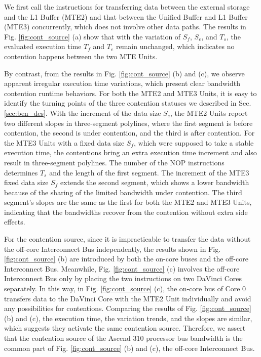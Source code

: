 \documentclass[12pt]{extbook}
\begin{document}
We first call the instructions for transferring data between the external storage and the L1 Buffer (MTE2) and that between the Unified Buffer and L1 Buffer (MTE3) concurrently, which does not involve other data paths. The results in Fig. \ref{fig:cont_source} (a) show that with the variation of $S_f$, $S_e$, and $T_s$, the evaluated execution time $T_f$ and $T_e$ remain unchanged, which indicates no contention happens between the two MTE Units.

By contrast, from the results in Fig. \ref{fig:cont_source} (b) and (c), we observe apparent irregular execution time variations, which present clear bandwidth contention runtime behaviors. For both the MTE2 and MTE3 Units, it is easy to identify the turning points of the three contention statuses we described in Sec. \ref{sec:ben_des}. With the increment of the data size $S_e$, the MTE2 Units report two different slopes in three-segment polylines, where the first segment is before contention, the second is under contention, and the third is after contention. For the MTE3 Units with a fixed data size $S_f$, which were supposed to take a stable execution time, the contentions bring an extra execution time increment and also result in three-segment polylines. The number of the NOP instructions determines $T_s$ and the length of the first segment. The increment of the MTE3 fixed data size $S_f$ extends the second segment, which shows a lower bandwidth because of the sharing of the limited bandwidth under contention. The third segment's slopes are the same as the first for both the MTE2 and MTE3 Units, indicating that the bandwidths recover from the contention without extra side effects.

For the contention source, since it is impracticable to transfer the data without the off-core Interconnect Bus independently, the results shown in Fig. \ref{fig:cont_source} (b) are introduced by both the on-core buses and the off-core Interconnect Bus. Meanwhile, Fig. \ref{fig:cont_source} (c) involves the off-core Interconnect Bus only by placing the two instructions on two DaVinci Cores separately. In this way, in Fig. \ref{fig:cont_source} (c), the on-core bus of Core 0 transfers data to the DaVinci Core with the MTE2 Unit individually and avoid any possibilities for contentions. Comparing the results of Fig. \ref{fig:cont_source} (b) and (c), the execution time, the variation trends, and the slopes are similar, which suggests they activate the same contention source. Therefore, we assert that the contention source of the Ascend 310 processor bus bandwidth is the common part of Fig. \ref{fig:cont_source} (b) and (c), the off-core Interconnect Bus.
\end{document}
